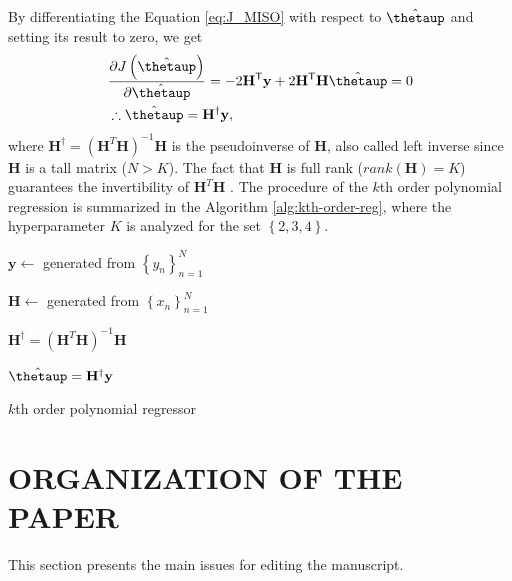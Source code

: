 \documentclass[english]{sobraep}
\newcommand{\trans}{\mathsf{T}}
\begin{document}
By differentiating the Equation \eqref{eq:J_MISO} with respect to \(\hat{\boldsymbol{\thetaup}}\) and setting its result to zero, we get
\begin{align}
    &\frac{\partial J\left( \hat{\boldsymbol{\thetaup}} \right)}{\partial \hat{\boldsymbol{\thetaup}}} = - 2\mathbf{H}^\trans \mathbf{y} + 2 \mathbf{H}^\trans \mathbf{H} \hat{\boldsymbol{\thetaup}} = 0 \nonumber \\
    &\therefore \hat{\boldsymbol{\thetaup}} = \mathbf{H}^\dagger \mathbf{y},
\end{align}
where \(\mathbf{H}^\dagger = \left( \mathbf{H}^T\mathbf{H} \right)^{-1}\mathbf{H}\) is the pseudoinverse of \(\mathbf{H}\), also called left inverse since \(\mathbf{H}\) is a tall matrix (\(N>K\)). The fact that \(\mathbf{H}\) is full rank (\(rank(\mathbf{H})=K\)) guarantees the invertibility of \(\mathbf{H}^T\mathbf{H}\) \cite{strang1993introduction}. The procedure of the \(k\)th order polynomial regression is summarized in the Algorithm \ref{alg:kth-order-reg}, where the hyperparameter \(K\) is analyzed for the set \(\left\{ 2,3,4 \right\}\).

\begin{algorithm}[!ht]
    \DontPrintSemicolon
      
        {
            \(\mathbf{y} \leftarrow\) generated from \(\left\{ y_n \right\}_{n=1}^N\)

            \(\mathbf{H} \leftarrow\) generated from \(\left\{ x_n \right\}_{n=1}^N\)

            \(\mathbf{H}^\dagger = \left( \mathbf{H}^T\mathbf{H} \right)^{-1}\mathbf{H}\) 

            \(\hat{\boldsymbol{\thetaup}} = \mathbf{H}^\dagger \mathbf{y}\)
        }
    
    \caption{\(k\)th order polynomial regressor}
    \label{alg:kth-order-reg}
\end{algorithm}

\section{ORGANIZATION OF THE PAPER}

This section presents the main issues for editing the manuscript.
\end{document}

